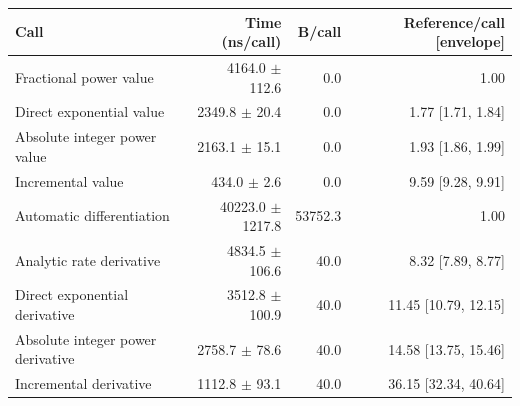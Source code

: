 \begin{tabular}{lrrr}
\toprule
Call & Time (ns/call) & B/call & Reference/call [envelope] \\
\midrule
Fractional power value & 4164.0 $\pm$ 112.6 & 0.0 & 1.00 \\
Direct exponential value & 2349.8 $\pm$ 20.4 & 0.0 & 1.77 [1.71, 1.84] \\
Absolute integer power value & 2163.1 $\pm$ 15.1 & 0.0 & 1.93 [1.86, 1.99] \\
Incremental value & 434.0 $\pm$ 2.6 & 0.0 & 9.59 [9.28, 9.91] \\
Automatic differentiation & 40223.0 $\pm$ 1217.8 & 53752.3 & 1.00 \\
Analytic rate derivative & 4834.5 $\pm$ 106.6 & 40.0 & 8.32 [7.89, 8.77] \\
Direct exponential derivative & 3512.8 $\pm$ 100.9 & 40.0 & 11.45 [10.79, 12.15] \\
Absolute integer power derivative & 2758.7 $\pm$ 78.6 & 40.0 & 14.58 [13.75, 15.46] \\
Incremental derivative & 1112.8 $\pm$ 93.1 & 40.0 & 36.15 [32.34, 40.64] \\
\bottomrule
\end{tabular}
